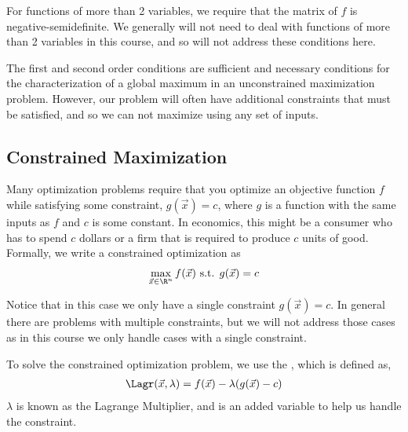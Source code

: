 For functions of more than 2 variables, we require that the  matrix of $f$ is negative-semidefinite. We generally will not need to deal with functions of more than 2 variables in this course, and so will not address these conditions here. 

The first and second order conditions are sufficient and necessary conditions for the characterization of a global maximum in an unconstrained maximization problem. However, our problem will often have additional constraints that must be satisfied, and so we can not maximize using any set of inputs.

\subsection*{Constrained Maximization} \label{sec:constrained_maximization}
Many optimization problems require that you optimize an objective function $f$ while satisfying some constraint, $g(\vec{x}) = c$, where $g$ is a function with the same inputs as $f$ and $c$ is some constant. In economics, this might be a consumer who has to spend $c$ dollars or a firm that is required to produce $c$ units of good. Formally, we write a constrained optimization as
\begin{align*}
    \max_{\vec{x} \in \R^n} f(\vec{x}) \text{ s.t. } g(\vec{x}) = c
\end{align*}

Notice that in this case we only have a single constraint $g(\vec{x}) = c$. In general there are problems with multiple constraints, but we will not address those cases as in this course we only handle cases with a single constraint. 

To solve the constrained optimization problem, we use the , which is defined as,
\begin{align*}
    \Lagr(\vec{x}, \lambda) = f(\vec{x}) - \lambda(g(\vec{x}) - c)
\end{align*}
$\lambda$ is known as the Lagrange Multiplier, and is an added variable to help us handle the constraint. 

